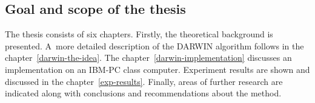\subsection{Goal and scope of the thesis}

The thesis consists of six chapters. Firstly, the theoretical background is
presented. A~more detailed description of the DARWIN algorithm follows in the
chapter~\ref{darwin-the-idea}. The chapter~\ref{darwin-implementation}
discusses an implementation on an IBM-PC class computer. Experiment results
are shown and discussed in the chapter~\ref{exp-results}. Finally, areas of
further research are indicated along with conclusions and recommendations
about the method.
